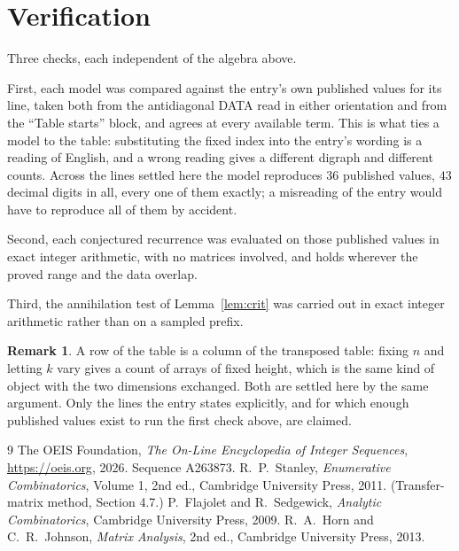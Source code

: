 \documentclass[11pt,a4paper]{article}
\theoremstyle{plain}
\theoremstyle{definition}
\newtheorem{remark}[theorem]{Remark}
\begin{document}
\section{Verification}

Three checks, each independent of the algebra above.

First, each model was compared against the entry's own published values for its line, taken
both from the antidiagonal DATA read in either orientation and from the ``Table starts''
block, and agrees at every available term. This is what ties a model to the table:
substituting the fixed index into the entry's wording is a reading of English, and a wrong
reading gives a different digraph and different counts. Across the lines settled here the
model reproduces $36$ published values, $43$ decimal digits in all, every one of
them exactly; a misreading of the entry would have to reproduce all of them by accident.

Second, each conjectured recurrence was evaluated on those published values in exact
integer arithmetic, with no matrices involved, and holds wherever the proved range and the
data overlap.

Third, the annihilation test of Lemma~\ref{lem:crit} was carried out in exact integer
arithmetic rather than on a sampled prefix.

\begin{remark}
A row of the table is a column of the transposed table: fixing $n$ and letting $k$ vary gives a
count of arrays of fixed height, which is the same kind of object with the two dimensions
exchanged. Both are settled here by the same argument. Only the lines the entry states
explicitly, and for which enough published values exist to run the first check above, are
claimed.
\end{remark}

\begin{thebibliography}{9}
 The OEIS Foundation, \emph{The On-Line Encyclopedia of Integer
Sequences}, \url{https://oeis.org}, 2026. Sequence A263873.
 R.~P.~Stanley, \emph{Enumerative Combinatorics}, Volume 1, 2nd ed.,
Cambridge University Press, 2011. (Transfer-matrix method, Section 4.7.)
 P.~Flajolet and R.~Sedgewick, \emph{Analytic Combinatorics}, Cambridge
University Press, 2009.
 R.~A.~Horn and C.~R.~Johnson, \emph{Matrix Analysis}, 2nd ed., Cambridge
University Press, 2013.
\end{thebibliography}
\end{document}
